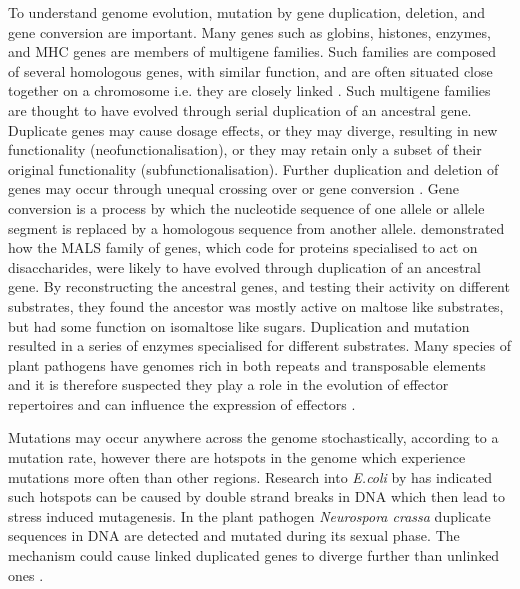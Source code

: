 To understand genome evolution, mutation by gene duplication, deletion, and gene conversion are important.
Many genes such as globins, histones, enzymes, and MHC genes are members of multigene families. Such families are composed of several homologous genes, with similar function, and are often situated close together on a chromosome i.e. they are closely linked \parencite{Hedrick2010}.
Such multigene families are thought to have evolved through serial duplication of an ancestral gene.
Duplicate genes may cause dosage effects, or they may diverge, resulting in new functionality (neofunctionalisation), or they may retain only a subset of their original functionality  (subfunctionalisation). 
Further duplication and deletion of genes may occur through unequal crossing over or gene conversion \parencite{Grauer2000}.
Gene conversion is a process by which the nucleotide sequence of one allele or allele segment is replaced by a homologous sequence from another allele.
\cite{Voordeckers2012} demonstrated how the MALS family of genes, which code for proteins specialised to act on disaccharides, were likely to have evolved through duplication of an ancestral gene.
By reconstructing the ancestral genes, and testing their activity on different substrates, they found the ancestor was mostly active on maltose like substrates, but had some function on isomaltose like sugars.
Duplication and mutation resulted in a series of enzymes specialised for different substrates.
Many species of plant pathogens have genomes rich in both repeats and transposable elements \parencite{Raffaele2012,Kemen2012} and it is therefore suspected they play a role in the evolution of effector repertoires and can influence the expression of effectors \parencite{Whisson2012}.

Mutations may occur anywhere across the genome stochastically, according to a mutation rate, however there are hotspots in the genome which experience mutations more often than other regions. 
Research into \textit{E.coli} by \cite{Shee2012} has indicated such hotspots can be caused by double strand breaks in DNA which then lead to stress induced mutagenesis.
In the plant pathogen \textit{Neurospora crassa} duplicate sequences in DNA are detected and mutated during its sexual phase. 
The mechanism could cause linked duplicated genes to diverge further than unlinked ones \parencite{Cambareri1991}. 

